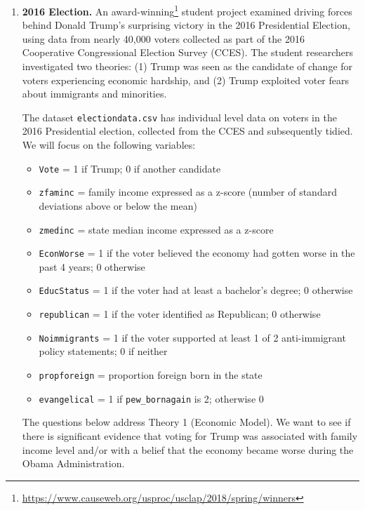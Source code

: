 \documentclass[
]{krantz}
\providecommand{\tightlist}{%
  \setlength{\itemsep}{0pt}\setlength{\parskip}{0pt}}
\renewcommand{\href}[2]{#2\footnote{\url{#1}}}
\begin{document}
\begin{enumerate}
\def\labelenumi{\arabic{enumi}.}
\setcounter{enumi}{4}
\item
  \textbf{2016 Election.} An \href{https://www.causeweb.org/usproc/usclap/2018/spring/winners}{award-winning} student project \citep{Renier2018} examined driving forces behind Donald Trump's surprising victory in the 2016 Presidential Election, using data from nearly 40,000 voters collected as part of the 2016 Cooperative Congressional Election Survey (CCES). The student researchers investigated two theories: (1) Trump was seen as the candidate of change for voters experiencing economic hardship, and (2) Trump exploited voter fears about immigrants and minorities.

  The dataset \texttt{electiondata.csv} has individual level data on voters in the 2016 Presidential election, collected from the CCES and subsequently tidied. We will focus on the following variables:

  \begin{itemize}
  \tightlist
  \item
    \texttt{Vote} = 1 if Trump; 0 if another candidate
  \item
    \texttt{zfaminc} = family income expressed as a z-score (number of standard deviations above or below the mean)
  \item
    \texttt{zmedinc} = state median income expressed as a z-score
  \item
    \texttt{EconWorse} = 1 if the voter believed the economy had gotten worse in the past 4 years; 0 otherwise
  \item
    \texttt{EducStatus} = 1 if the voter had at least a bachelor's degree; 0 otherwise
  \item
    \texttt{republican} = 1 if the voter identified as Republican; 0 otherwise
  \item
    \texttt{Noimmigrants} = 1 if the voter supported at least 1 of 2 anti-immigrant policy statements; 0 if neither
  \item
    \texttt{propforeign} = proportion foreign born in the state
  \item
    \texttt{evangelical} = 1 if \texttt{pew\_bornagain} is 2; otherwise 0
  \end{itemize}

  The questions below address Theory 1 (Economic Model). We want to see if there is significant evidence that voting for Trump was associated with family income level and/or with a belief that the economy became worse during the Obama Administration.


\end{enumerate}
\end{document}
